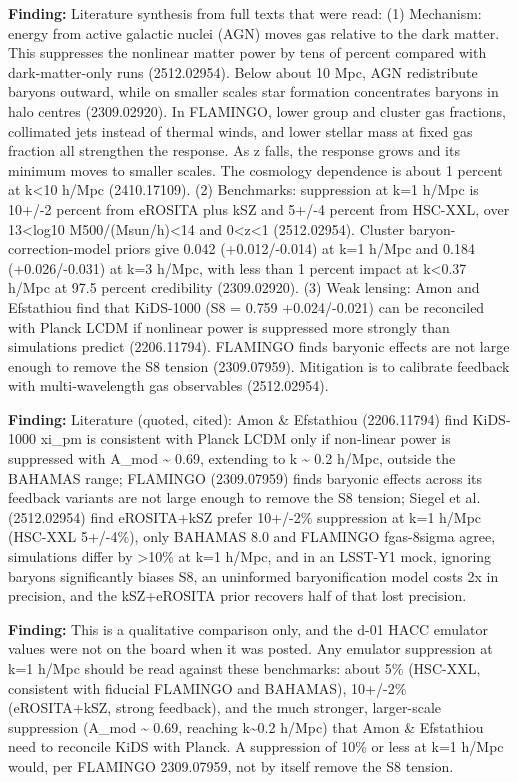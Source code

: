 \documentclass[11pt,a4paper]{article}
\begin{document}
\textbf{Finding:} Literature synthesis from full texts that were read: (1) Mechanism: energy from active galactic nuclei (AGN) moves gas relative to the dark matter. This suppresses the nonlinear matter power by tens of percent compared with dark-matter-only runs (2512.02954). Below about 10 Mpc, AGN redistribute baryons outward, while on smaller scales star formation concentrates baryons in halo centres (2309.02920). In FLAMINGO, lower group and cluster gas fractions, collimated jets instead of thermal winds, and lower stellar mass at fixed gas fraction all strengthen the response. As z falls, the response grows and its minimum moves to smaller scales. The cosmology dependence is about 1 percent at k\textless{}10 h/Mpc (2410.17109). (2) Benchmarks: suppression at k=1 h/Mpc is 10+/-2 percent from eROSITA plus kSZ and 5+/-4 percent from HSC-XXL, over 13\textless{}log10 M500/(Msun/h)\textless{}14 and 0\textless{}z\textless{}1 (2512.02954). Cluster baryon-correction-model priors give 0.042 (+0.012/-0.014) at k=1 h/Mpc and 0.184 (+0.026/-0.031) at k=3 h/Mpc, with less than 1 percent impact at k\textless{}0.37 h/Mpc at 97.5 percent credibility (2309.02920). (3) Weak lensing: Amon and Efstathiou find that KiDS-1000 (S8 = 0.759 +0.024/-0.021) can be reconciled with Planck LCDM if nonlinear power is suppressed more strongly than simulations predict (2206.11794). FLAMINGO finds baryonic effects are not large enough to remove the S8 tension (2309.07959). Mitigation is to calibrate feedback with multi-wavelength gas observables (2512.02954).

\textbf{Finding:} Literature (quoted, cited): Amon \& Efstathiou (2206.11794) find KiDS-1000 xi\_pm is consistent with Planck LCDM only if non-linear power is suppressed with A\_mod \textasciitilde{} 0.69, extending to k \textasciitilde{} 0.2 h/Mpc, outside the BAHAMAS range; FLAMINGO (2309.07959) finds baryonic effects across its feedback variants are not large enough to remove the S8 tension; Siegel et al. (2512.02954) find eROSITA+kSZ prefer 10+/-2\% suppression at k=1 h/Mpc (HSC-XXL 5+/-4\%), only BAHAMAS 8.0 and FLAMINGO fgas-8sigma agree, simulations differ by \textgreater{}10\% at k=1 h/Mpc, and in an LSST-Y1 mock, ignoring baryons significantly biases S8, an uninformed baryonification model costs 2x in precision, and the kSZ+eROSITA prior recovers half of that lost precision.

\textbf{Finding:} This is a qualitative comparison only, and the d-01 HACC emulator values were not on the board when it was posted. Any emulator suppression at k=1 h/Mpc should be read against these benchmarks: about 5\% (HSC-XXL, consistent with fiducial FLAMINGO and BAHAMAS), 10+/-2\% (eROSITA+kSZ, strong feedback), and the much stronger, larger-scale suppression (A\_mod \textasciitilde{} 0.69, reaching k\textasciitilde{}0.2 h/Mpc) that Amon \& Efstathiou need to reconcile KiDS with Planck. A suppression of 10\% or less at k=1 h/Mpc would, per FLAMINGO 2309.07959, not by itself remove the S8 tension.
\end{document}
